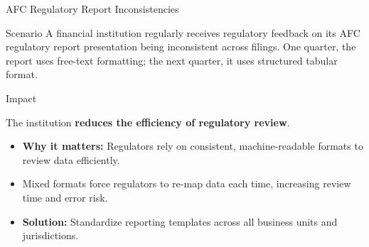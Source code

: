 \documentclass{beamer}
\begin{document}
	\begin{frame}{AFC Regulatory Report Inconsistencies}
		\begin{block}{Scenario}
			A financial institution regularly receives regulatory feedback on its AFC regulatory report presentation being inconsistent across filings. One quarter, the report uses free-text formatting; the next quarter, it uses structured tabular format.
		\end{block}
		\begin{block}{Impact}
			\begin{center}
				The institution \textbf{reduces the efficiency of regulatory review}.
			\end{center}
		\end{block}
		\begin{itemize}
			\item \textbf{Why it matters:} Regulators rely on consistent, machine-readable formats to review data efficiently.
			\item Mixed formats force regulators to re-map data each time, increasing review time and error risk.
			\item \textbf{Solution:} Standardize reporting templates across all business units and jurisdictions.
		\end{itemize}
	\end{frame}
	
\end{document}
